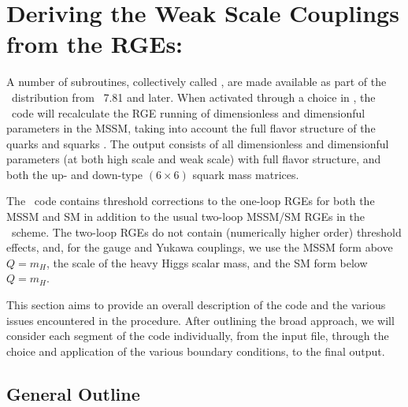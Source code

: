 \newpage
\section{Deriving the Weak Scale Couplings from the RGEs:
\progrge}\label{sec:rgeflav}

A number of subroutines, collectively called \progrge, are made
available as part of the \progisa~distribution from \progisa~7.81 and
later. When activated through a choice in \progisasug, the
\progrge~code will recalculate the RGE running of dimensionless and
dimensionful parameters in the MSSM, taking into account the full flavor
structure of the quarks and squarks \cite{RGE1,RGE2,diss}. The output
consists of all dimensionless and dimensionful parameters (at both high
scale and weak scale) with full flavor structure, and both the up- and
down-type $(6\times6)$ squark mass matrices.

The \progrge~code contains threshold corrections to the one-loop RGEs
for both the MSSM and SM in addition to the usual two-loop MSSM/SM RGEs
in the \drb~scheme. The two-loop RGEs do not contain (numerically higher
order) threshold effects, and, for the gauge and Yukawa couplings, we
use the MSSM form above $Q=m_{H}$, the scale of the heavy Higgs scalar
mass, and the SM form below $Q=m_{H}$.

This section aims to provide an overall description of the code and the
various issues encountered in the procedure. After outlining the broad
approach, we will consider each segment of the code individually, from
the input file, through the choice and application of the various
boundary conditions, to the final output.

\subsection*{General Outline}

